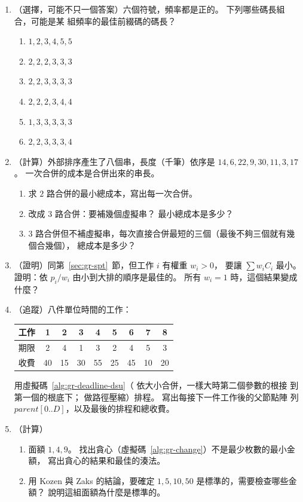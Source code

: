 \begin{enumerate}
\item （選擇，可能不只一個答案）六個符號，頻率都是正的。 下列哪些碼長組合，可能是某
組頻率的最佳前綴碼的碼長？
\begin{enumerate}
\item $1, 2, 3, 4, 5, 5$
\item $2, 2, 2, 3, 3, 3$
\item $2, 2, 3, 3, 3, 3$
\item $2, 2, 2, 3, 4, 4$
\item $1, 3, 3, 3, 3, 3$
\item $2, 2, 3, 3, 3, 4$
\end{enumerate}

\item \label{q:gr-kmerge-q}（計算）外部排序產生了八個串，長度（千筆）依序是
$14, 6, 22, 9, 30, 11, 3, 17$。 一次合併的成本是合併出來的串長。
\begin{enumerate}
\item 求 $2$ 路合併的最小總成本，寫出每一次合併。
\item 改成 $3$ 路合併：要補幾個虛擬串？ 最小總成本是多少？
\item $3$ 路合併但不補虛擬串，每次直接合併最短的三個（最後不夠三個就有幾個合幾個），
總成本是多少？
\end{enumerate}

\item \label{q:gr-wspt}（證明）同第~\ref{sec:gr-spt}~節，但工作 $i$ 有權重 $w_i > 0$，
要讓 $\sum w_i C_i$ 最小。 證明：依 $p_i / w_i$ 由小到大排的順序是最佳的。 所有
$w_i = 1$ 時，這個結果變成什麼？

\item \label{q:gr-dl-trace}（追蹤）八件單位時間的工作：
\begin{center}
\begin{tabular}{c*{8}{c}}
\toprule
工作 & 1 & 2 & 3 & 4 & 5 & 6 & 7 & 8 \\
\midrule
期限 & 2 & 4 & 1 & 3 & 2 & 4 & 5 & 3 \\
收費 & 40 & 15 & 30 & 55 & 25 & 45 & 10 & 20 \\
\bottomrule
\end{tabular}
\end{center}
用虛擬碼~\ref{alg:gr-deadline-dsu}（ 依大小合併，一樣大時第二個參數的根接
到第一個的根底下； 做路徑壓縮）排程。 寫出每接下一件工作後的父節點陣
列 $\mathit{parent}[0..D]$，以及最後的排程和總收費。

\item \label{q:gr-coin}（計算）
\begin{enumerate}
\item 面額 $1, 4, 9$。 找出貪心（虛擬碼~\ref{alg:gr-change}）不是最少枚數的最小金額，
寫出貪心的結果和最佳的湊法。
\item 用 Kozen 與 Zaks 的結論，要確定 $1, 5, 10, 50$ 是標準的，需要檢查哪些金額？
說明這組面額為什麼是標準的。
\end{enumerate}


\end{enumerate}
